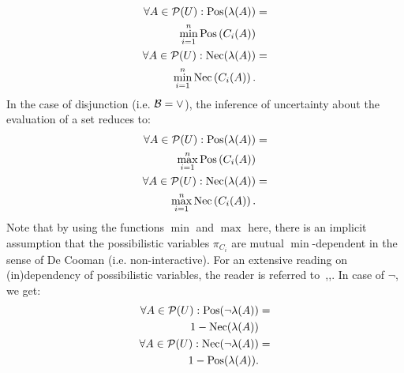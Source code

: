 \begin{eqnarray}
\label{eq:conjunctive1}
\forall A\in\mathcal{P}(U):\operatorname{Pos}(\lambda(A))&=\\
\nonumber
\min_{i=1}^n\operatorname{Pos}\left(C_i(A)\right)\\
\label{eq:conjunctive2}
\forall A\in\mathcal{P}(U):\operatorname{Nec}(\lambda(A))&=\\
\nonumber
\min_{i=1}^n\operatorname{Nec}\left(C_i(A)\right).
\end{eqnarray}
In the case of disjunction (i.e. $\operatorname*{\mathcal{B}}=\vee$), the inference of uncertainty about the evaluation of a set reduces to:
\begin{eqnarray}
\label{eq:disjunctive}
\forall A\in\mathcal{P}(U):\operatorname{Pos}(\lambda(A))&=\\
\nonumber
\max_{i=1}^n\operatorname{Pos}\left(C_i(A)\right)\\
\forall A\in\mathcal{P}(U):\operatorname{Nec}(\lambda(A))&=\\
\nonumber
\max_{i=1}^n\operatorname{Nec}\left(C_i(A)\right).
\end{eqnarray}
Note that by using the functions $\min$ and $\max$ here, there is an implicit assumption that the possibilistic variables $\pi_{C_i}$ are mutual $\min$-dependent in the sense of De Cooman (i.e. non-interactive). For an extensive reading on (in)dependency of possibilistic variables, the reader is referred to~\cite{GertDeCooman1997b},\cite{GertDeCooman1997a},\cite{GertDeCooman1997}. In case of $\neg$, we get:
\begin{eqnarray}
\label{eq:negation}
\forall A\in\mathcal{P}(U):\operatorname{Pos}(\neg\lambda(A))&=\\
\nonumber
1-\operatorname{Nec}(\lambda(A))\\
\forall A\in\mathcal{P}(U):\operatorname{Nec}(\neg\lambda(A))&=\\
\nonumber
1-\operatorname{Pos}(\lambda(A)).
\end{eqnarray}

